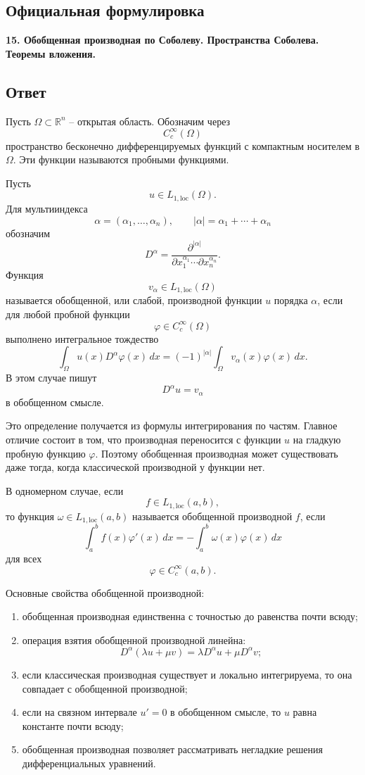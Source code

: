 \documentclass[12pt,a4paper]{article}
\newcommand{\R}{\mathbb{R}}
\begin{document}
\subsection*{Официальная формулировка}
\textbf{15. Обобщенная производная по Соболеву. Пространства Соболева. Теоремы вложения.}

\subsection*{Ответ}
Пусть \(\Omega\subset\R^n\) -- открытая область. Обозначим через
\[
C_c^\infty(\Omega)
\]
пространство бесконечно дифференцируемых функций с компактным носителем в \(\Omega\). Эти функции называются пробными функциями.

Пусть
\[
u\in L_{1,\mathrm{loc}}(\Omega).
\]
Для мультииндекса
\[
\alpha=(\alpha_1,\ldots,\alpha_n),\qquad
|\alpha|=\alpha_1+\cdots+\alpha_n
\]
обозначим
\[
D^\alpha=
\frac{\partial^{|\alpha|}}{\partial x_1^{\alpha_1}\cdots \partial x_n^{\alpha_n}}.
\]
Функция
\[
v_\alpha\in L_{1,\mathrm{loc}}(\Omega)
\]
называется обобщенной, или слабой, производной функции \(u\) порядка \(\alpha\), если для любой пробной функции
\[
\varphi\in C_c^\infty(\Omega)
\]
выполнено интегральное тождество
\[
\int_\Omega u(x)D^\alpha\varphi(x)\,dx
=
(-1)^{|\alpha|}
\int_\Omega v_\alpha(x)\varphi(x)\,dx.
\]
В этом случае пишут
\[
D^\alpha u=v_\alpha
\]
в обобщенном смысле.

Это определение получается из формулы интегрирования по частям. Главное отличие состоит в том, что производная переносится с функции \(u\) на гладкую пробную функцию \(\varphi\). Поэтому обобщенная производная может существовать даже тогда, когда классической производной у функции нет.

В одномерном случае, если
\[
f\in L_{1,\mathrm{loc}}(a,b),
\]
то функция \(\omega\in L_{1,\mathrm{loc}}(a,b)\) называется обобщенной производной \(f\), если
\[
\int_a^b f(x)\varphi'(x)\,dx
=
-
\int_a^b \omega(x)\varphi(x)\,dx
\]
для всех
\[
\varphi\in C_c^\infty(a,b).
\]

Основные свойства обобщенной производной:
\begin{enumerate}[leftmargin=2em]
\item обобщенная производная единственна с точностью до равенства почти всюду;
\item операция взятия обобщенной производной линейна:
\[
D^\alpha(\lambda u+
\mu v)=\lambda D^\alpha u+\mu D^\alpha v;
\]
\item если классическая производная существует и локально интегрируема, то она совпадает с обобщенной производной;
\item если на связном интервале \(u'=0\) в обобщенном смысле, то \(u\) равна константе почти всюду;
\item обобщенная производная позволяет рассматривать негладкие решения дифференциальных уравнений.
\end{enumerate}
\end{document}
